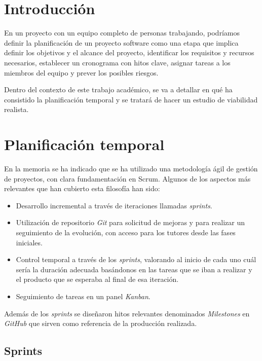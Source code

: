 
\section{Introducción}

En un proyecto con un equipo completo de personas trabajando, podríamos definir la planificación de un proyecto software como una etapa que implica definir los objetivos y el alcance del proyecto, identificar los requisitos y recursos necesarios, establecer un cronograma con hitos clave, asignar tareas a los miembros del equipo y prever los posibles riesgos. 

Dentro del contexto de este trabajo académico, se va a detallar en qué ha consistido la planificación temporal y se tratará de hacer un estudio de viabilidad realista.


\section{Planificación temporal}

En la memoria se ha indicado que se ha utilizado una metodología ágil de gestión de proyectos, con clara fundamentación en Scrum. Algunos de los aspectos más relevantes que han cubierto esta filosofía han sido:

\begin{itemize}
\tightlist
\item  
Desarrollo incremental a través de iteraciones llamadas \emph{sprints}.
\item
Utilización de repositorio \emph{Git} para solicitud de mejoras y para realizar un seguimiento de la evolución, con acceso para los tutores desde las fases iniciales. 
\item
Control temporal a través de los \emph{sprints}, valorando al inicio de cada uno 
cuál sería la duración adecuada basándonos en las tareas que se iban a realizar y el producto que se esperaba al final de esa iteración. 
\item
Seguimiento de tareas en un panel \emph{Kanban}.
\end{itemize}

Además de los \emph{sprints} se diseñaron hitos relevantes denominados \emph{Milestones} en \emph{GitHub} que sirven como referencia de la producción realizada. 

\subsection{Sprints}

